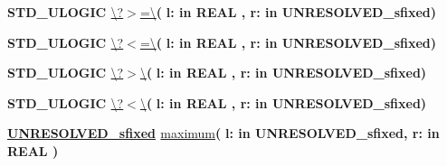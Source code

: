 \begin{DoxyCompactItemize}
\item 
{\bfseries {\bfseries \textcolor{comment}{S\+T\+D\+\_\+\+U\+L\+O\+G\+I\+C}\textcolor{vhdlchar}{ }}} \hyperlink{classfixed__pkg_a3adee8c12e5c0bb76fc3e1a493284a27}{\textbackslash{}?$>$=\textbackslash{}}{\bfseries  ( }{\bfseries \textcolor{vhdlchar}{l\+: }\textcolor{stringliteral}{in }{\bfseries \textcolor{comment}{R\+E\+A\+L}\textcolor{vhdlchar}{ }}}{\bfseries  , \textcolor{vhdlchar}{r\+: }\textcolor{stringliteral}{in }\textcolor{vhdlchar}{U\+N\+R\+E\+S\+O\+L\+V\+E\+D\+\_\+sfixed}}{\bfseries  )} 
\item 
{\bfseries {\bfseries \textcolor{comment}{S\+T\+D\+\_\+\+U\+L\+O\+G\+I\+C}\textcolor{vhdlchar}{ }}} \hyperlink{classfixed__pkg_a271da29f659a2bc9480dbd29d7727913}{\textbackslash{}?$<$=\textbackslash{}}{\bfseries  ( }{\bfseries \textcolor{vhdlchar}{l\+: }\textcolor{stringliteral}{in }{\bfseries \textcolor{comment}{R\+E\+A\+L}\textcolor{vhdlchar}{ }}}{\bfseries  , \textcolor{vhdlchar}{r\+: }\textcolor{stringliteral}{in }\textcolor{vhdlchar}{U\+N\+R\+E\+S\+O\+L\+V\+E\+D\+\_\+sfixed}}{\bfseries  )} 
\item 
{\bfseries {\bfseries \textcolor{comment}{S\+T\+D\+\_\+\+U\+L\+O\+G\+I\+C}\textcolor{vhdlchar}{ }}} \hyperlink{classfixed__pkg_a9e6b6b8c2c14da978e6f70cb6e85e6dc}{\textbackslash{}?$>$\textbackslash{}}{\bfseries  ( }{\bfseries \textcolor{vhdlchar}{l\+: }\textcolor{stringliteral}{in }{\bfseries \textcolor{comment}{R\+E\+A\+L}\textcolor{vhdlchar}{ }}}{\bfseries  , \textcolor{vhdlchar}{r\+: }\textcolor{stringliteral}{in }\textcolor{vhdlchar}{U\+N\+R\+E\+S\+O\+L\+V\+E\+D\+\_\+sfixed}}{\bfseries  )} 
\item 
{\bfseries {\bfseries \textcolor{comment}{S\+T\+D\+\_\+\+U\+L\+O\+G\+I\+C}\textcolor{vhdlchar}{ }}} \hyperlink{classfixed__pkg_a7e98e66a4a282c529968f69f70dd16ad}{\textbackslash{}?$<$\textbackslash{}}{\bfseries  ( }{\bfseries \textcolor{vhdlchar}{l\+: }\textcolor{stringliteral}{in }{\bfseries \textcolor{comment}{R\+E\+A\+L}\textcolor{vhdlchar}{ }}}{\bfseries  , \textcolor{vhdlchar}{r\+: }\textcolor{stringliteral}{in }\textcolor{vhdlchar}{U\+N\+R\+E\+S\+O\+L\+V\+E\+D\+\_\+sfixed}}{\bfseries  )} 
\item 
{\bfseries {\bfseries {\bfseries \hyperlink{classfixed__pkg_aa723b28a027c3c0f9bca02d75e8df4d6}{U\+N\+R\+E\+S\+O\+L\+V\+E\+D\+\_\+sfixed}} \textcolor{vhdlchar}{ }}} \hyperlink{classfixed__pkg_a427ed4c94126ca4966f81712b325a314}{maximum}{\bfseries  ( }{\bfseries \textcolor{vhdlchar}{l\+: }\textcolor{stringliteral}{in }\textcolor{vhdlchar}{U\+N\+R\+E\+S\+O\+L\+V\+E\+D\+\_\+sfixed}}{\bfseries  , \textcolor{vhdlchar}{r\+: }\textcolor{stringliteral}{in }{\bfseries \textcolor{comment}{R\+E\+A\+L}\textcolor{vhdlchar}{ }}}{\bfseries  )} 

\end{DoxyCompactItemize}
